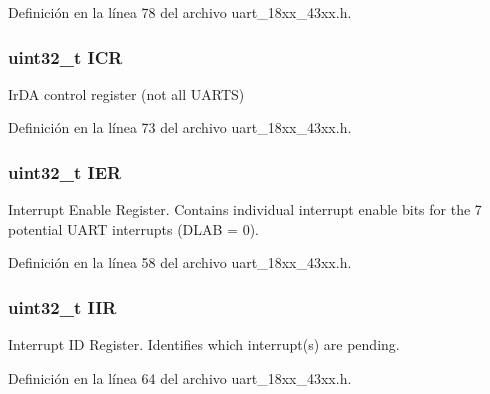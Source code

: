 Definición en la línea 78 del archivo uart\+\_\+18xx\+\_\+43xx.\+h.

\subsubsection[{\texorpdfstring{I\+CR}{ICR}}]{ uint32\+\_\+t I\+CR}\hypertarget{struct_l_p_c___u_s_a_r_t___t_a0a8c8230846fd8ff154b9fde8dfa0399}{}\label{struct_l_p_c___u_s_a_r_t___t_a0a8c8230846fd8ff154b9fde8dfa0399}
Ir\+DA control register (not all U\+A\+R\+TS) 

Definición en la línea 73 del archivo uart\+\_\+18xx\+\_\+43xx.\+h.

\subsubsection[{\texorpdfstring{I\+ER}{IER}}]{ uint32\+\_\+t I\+ER}\hypertarget{struct_l_p_c___u_s_a_r_t___t_a6566f8cfbd1d8aa7e8db046aa35e77db}{}\label{struct_l_p_c___u_s_a_r_t___t_a6566f8cfbd1d8aa7e8db046aa35e77db}
Interrupt Enable Register. Contains individual interrupt enable bits for the 7 potential U\+A\+RT interrupts (D\+L\+AB = 0). 

Definición en la línea 58 del archivo uart\+\_\+18xx\+\_\+43xx.\+h.

\subsubsection[{\texorpdfstring{I\+IR}{IIR}}]{ uint32\+\_\+t I\+IR}\hypertarget{struct_l_p_c___u_s_a_r_t___t_a2cab358d182aaf444bd1e2e6fa824d15}{}\label{struct_l_p_c___u_s_a_r_t___t_a2cab358d182aaf444bd1e2e6fa824d15}
Interrupt ID Register. Identifies which interrupt(s) are pending. 

Definición en la línea 64 del archivo uart\+\_\+18xx\+\_\+43xx.\+h.

